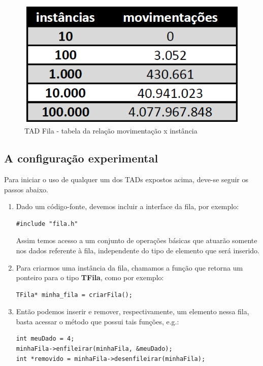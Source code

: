 \documentclass[12pt]{article}
\begin{document}
\begin{figure}[h!]
\centering
\includegraphics[width=.4\textwidth]{movimentacoes_parcial.PNG}
\caption{TAD Fila - tabela da relação movimentação x instância}
\label{fig:t2}
\end{figure}


\subsection{A configuração experimental}

Para iniciar o uso de qualquer um dos TADs expostos acima, deve-se seguir os passos abaixo.

\begin{enumerate}
    \item Dado um código-fonte, devemos incluir a interface da fila, por exemplo:
\begin{lstlisting}[frame=single]
#include "fila.h"
\end{lstlisting}

Assim temos acesso a um conjunto de operações básicas que atuarão somente nos dados referente à fila, independente do tipo de elemento que será inserido.

    \item Para criarmos uma instância da fila, chamamos a função que retorna um ponteiro para o tipo \textbf{TFila}, como por exemplo:
\begin{lstlisting}[frame=single]
TFila* minha_fila = criarFila();
\end{lstlisting}

    \item Então podemos inserir e remover, respectivamente, um elemento nessa fila, basta acessar o método que possui tais funções, e.g.:
\begin{lstlisting}[frame=single]
int meuDado = 4;
minhaFila->enfileirar(minhaFila, &meuDado);
int *removido = minhaFila->desenfileirar(minhaFila);
\end{lstlisting}
\end{enumerate}
\end{document}
